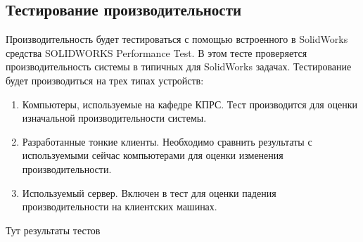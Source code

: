 \subsection{Тестирование производительности}

Производительность будет тестироваться с помощью встроенного в SolidWorks средства
SOLIDWORKS Performance Test. В этом тесте проверяется производительность системы в
типичных для SolidWorks задачах. Тестирование будет производиться на трех типах
устройств:
\begin{enumerate}
    \item Компьютеры, используемые на кафедре КПРС. Тест производится для оценки
        изначальной производительности системы.
    \item Разработанные тонкие клиенты. Необходимо сравнить результаты с используемыми
        сейчас компьютерами для оценки изменения производительности.
    \item Используемый сервер. Включен в тест для оценки падения производительности на
        клиентских машинах.
\end{enumerate}

Тут результаты тестов
